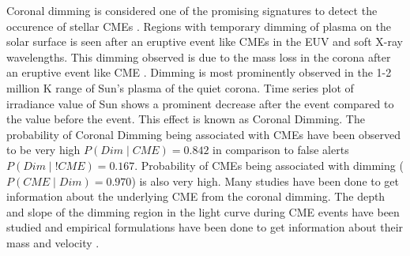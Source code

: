 Coronal dimming is considered one of the promising signatures to detect the occurence of stellar CMEs \citep{Namekata2022-dm}. Regions with temporary dimming of plasma on the solar surface is seen after an eruptive event like CMEs in the EUV and soft X-ray wavelengths. This dimming observed is due to the mass loss in the corona after an eruptive event like CME \citep{Mason2014}. Dimming is most prominently observed in the 1-2 million K range of Sun's plasma of the quiet corona. Time series plot of irradiance value of Sun shows a prominent decrease after the event compared to the value before the event. This effect is known as Coronal Dimming. The probability of Coronal Dimming being associated with CMEs have been observed to be very high $P(Dim \mid CME) = 0.842$ in comparison to false alerts $P(Dim \mid !CME) = 0.167$. Probability of CMEs being associated with dimming ($P(CME \mid Dim) = 0.970$) is also very high\citep{Veronig2021-rf}. Many studies have been done to get information about the underlying CME from the coronal dimming. The depth and slope of the dimming region in the light curve during CME events have been studied and empirical formulations have been done to get information about their mass and velocity \citep{Mason2016}.\\

